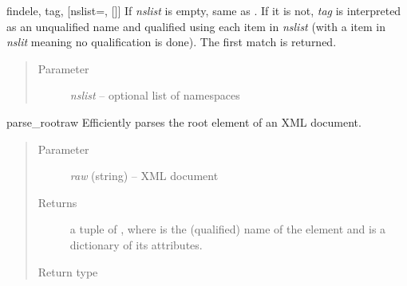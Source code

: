 \documentclass[a4paper,10pt,english]{manual}
\begin{document}
\hypertarget{ncclient.content.find}{}\begin{funcdesc}{find}{ele, tag, {[}nslist=, {[}{]}{]}}
If \emph{nslist} is empty, same as \href{http://docs.python.org/library/xml.etree.elementtree.html\#xml.etree.ElementTree.Element.find}{}. If it is not, \emph{tag} is interpreted as an unqualified name and qualified using each item in \emph{nslist} (with a \href{http://docs.python.org/library/constants.html\#None}{} item in \emph{nslit} meaning no qualification is done). The first match is returned.
\begin{quote}\begin{description}
\item[Parameter]
\emph{nslist} -- optional list of namespaces

\end{description}\end{quote}
\end{funcdesc}

\hypertarget{ncclient.content.parse_root}{}\begin{funcdesc}{parse\_root}{raw}
Efficiently parses the root element of an XML document.
\begin{quote}\begin{description}
\item[Parameter]
\emph{raw} (string) -- XML document

\item[Returns]
a tuple of , where  is the (qualified) name of the element and  is a dictionary of its attributes.

\item[Return type]
\href{http://docs.python.org/library/functions.html\#tuple}{}

\end{description}\end{quote}
\end{funcdesc}
\end{document}

